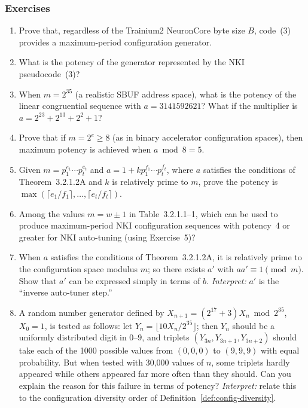 \documentclass[12pt]{article}
\newcommand{\SBUF}{\textsc{SBUF}}                 %
\begin{document}
\subsubsection*{Exercises}
\begin{enumerate}
\item[\textbf{1.}] [$M10$] Prove that, regardless of the Trainium2 NeuronCore byte size $B$, code~(3) provides a maximum-period configuration generator.

\item[\textbf{2.}] [10] What is the potency of the generator represented by the NKI pseudocode~(3)?

\item[\textbf{3.}] [11] When $m = 2^{35}$ (a realistic \SBUF{} address space), what is the potency of the linear congruential sequence with $a = 3141592621$? What if the multiplier is $a = 2^{23} + 2^{13} + 2^2 + 1$?

\item[\textbf{4.}] [15] Prove that if $m = 2^e \geq 8$ (as in binary accelerator configuration spaces), then maximum potency is achieved when $a \bmod 8 = 5$.

\item[\textbf{5.}] [$M20$] Given $m = p_1^{e_1} \cdots p_t^{e_t}$ and $a = 1 + kp_1^{f_1} \cdots p_t^{f_t}$, where $a$ satisfies the conditions of Theorem~3.2.1.2A and $k$ is relatively prime to $m$, prove the potency is $\max(\lceil e_1/f_1 \rceil, \ldots, \lceil e_t/f_t \rceil)$.

\item[\textbf{6.}] [20] Among the values $m = w \pm 1$ in Table~3.2.1.1--1, which can be used to produce maximum-period NKI configuration sequences with potency~4 or greater for NKI auto-tuning (using Exercise~5)?

\item[\textbf{7.}] [$M20$] When $a$ satisfies the conditions of Theorem~3.2.1.2A, it is relatively prime to the configuration space modulus $m$; so there exists $a'$ with $aa' \equiv 1 \pmod{m}$. Show that $a'$ can be expressed simply in terms of $b$. \emph{Interpret:} $a'$ is the ``inverse auto-tuner step.''

\item[\textbf{8.}] [$M26$] A random number generator defined by $X_{n+1} = (2^{17} + 3)X_n \bmod 2^{35}$, $X_0 = 1$, is tested as follows: let $Y_n = \lfloor 10X_n/2^{35} \rfloor$; then $Y_n$ should be a uniformly distributed digit in $0\text{--}9$, and triplets $(Y_{3n}, Y_{3n+1}, Y_{3n+2})$ should take each of the 1000 possible values from $(0,0,0)$ to $(9,9,9)$ with equal probability. But when tested with 30,000 values of $n$, some triplets hardly appeared while others appeared far more often than they should. Can you explain the reason for this failure in terms of potency? \emph{Interpret:} relate this to the configuration diversity order of Definition~\ref{def:config-diversity}.
\end{enumerate}
\end{document}
